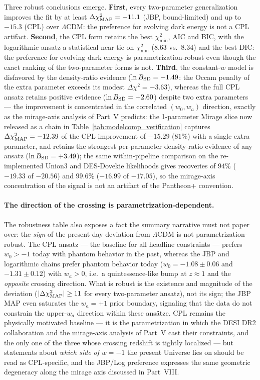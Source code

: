 \documentclass[11pt,letterpaper]{article}
\begin{document}
Three robust conclusions emerge. \textbf{First}, every two-parameter generalization improves the fit by at least $\Delta\chi^2_{\rm MAP} = -11.1$ (JBP, bound-limited) and up to $-15.3$ (CPL) over $\Lambda$CDM: the preference for evolving dark energy is not a CPL artifact. \textbf{Second}, the CPL form retains the best $\chi^2_{\min}$, AIC and BIC, with the logarithmic ansatz a statistical near-tie on $\chi^2_{\min}$ (8.63 vs.\ 8.34) and the best DIC: the preference for evolving dark energy is parametrization-robust even though the exact ranking of the two-parameter forms is not. \textbf{Third}, the constant-$w$ model is disfavored by the density-ratio evidence ($\ln B_{\rm SD} = -1.49$: the Occam penalty of the extra parameter exceeds its modest $\Delta\chi^2 = -3.63$), whereas the full CPL ansatz retains positive evidence ($\ln B_{\rm SD} = +2.60$) despite two extra parameters --- the improvement is concentrated in the correlated $(w_0, w_a)$ direction, exactly as the mirage-axis analysis of Part~V predicts: the 1-parameter Mirage slice now released as a chain in Table~\ref{tab:modelcomp_verification} captures $\Delta\chi^2_{\rm MAP} = -12.39$ of the CPL improvement of $-15.29$ ($81\%$) with a single extra parameter, and retains the strongest per-parameter density-ratio evidence of any ansatz ($\ln B_{\rm SD} = +3.49$); the same within-pipeline comparison on the re-implemented Union3 and DES-Dovekie likelihoods gives recoveries of $94\%$ ($-19.33$ of $-20.56$) and $99.6\%$ ($-16.99$ of $-17.05$), so the mirage-axis concentration of the signal is not an artifact of the Pantheon+ convention.

\paragraph{The direction of the crossing is parametrization-dependent.} The robustness table also exposes a fact the summary narrative must not paper over: the \emph{sign} of the present-day deviation from $\Lambda$CDM is not parametrization-robust. The CPL ansatz --- the baseline for all headline constraints --- prefers $w_0 > -1$ today with phantom behavior in the past, whereas the JBP and logarithmic chains prefer phantom behavior today ($w_0 = -1.08 \pm 0.06$ and $-1.31 \pm 0.12$) with $w_a > 0$, i.e.\ a quintessence-like bump at $z \approx 1$ and the \emph{opposite} crossing direction. What is robust is the existence and magnitude of the deviation ($|\Delta\chi^2_{\rm MAP}| \ge 11$ for every two-parameter ansatz), not its sign; the JBP MAP even saturates the $w_a = +1$ prior boundary, signaling that the data do not constrain the upper-$w_a$ direction within these ans\"atze. CPL remains the physically motivated baseline --- it is the parametrization in which the DESI DR2 collaboration and the mirage-axis analysis of Part~V cast their constraints, and the only one of the three whose crossing redshift is tightly localized --- but statements about \emph{which side of} $w = -1$ the present Universe lies on should be read as CPL-specific, and the JBP/Log preference expresses the same geometric degeneracy along the mirage axis discussed in Part~VIII.
\end{document}
